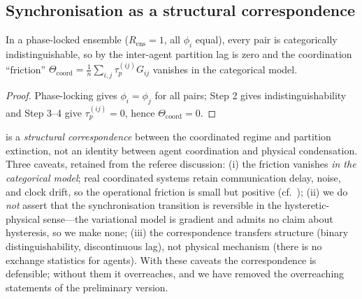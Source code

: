 \documentclass[11pt,twocolumn,a4paper]{article}
\newcommand{\tauP}{\tau_p}
\newcommand{\Ord}{R}
\begin{document}
\subsection{Synchronisation as a structural correspondence}

\begin{proposition}\label{prop:correspondence}
In a phase-locked ensemble ($\Ord_{\mathrm{ens}}=1$, all $\phi_i$ equal), every
pair is categorically indistinguishable, so by  the
inter-agent partition lag is zero and the coordination ``friction''
$\Theta_{\mathrm{coord}}=\frac1n\sum_{i,j}\tauP^{(ij)}G_{ij}$ vanishes in the
categorical model.
\end{proposition}

\begin{proof}
Phase-locking gives $\phi_i=\phi_j$ for all pairs;  Step 2
gives indistinguishability and Step 3--4 give $\tauP^{(ij)}=0$, hence
$\Theta_{\mathrm{coord}}=0$.
\end{proof}

\begin{remark}\label{rem:correspondence-scope}
 is a \emph{structural correspondence} between the
coordinated regime and partition extinction, not an identity between agent
coordination and physical condensation. Three caveats, retained from the
referee discussion: (i) the friction vanishes \emph{in the categorical model};
real coordinated systems retain communication delay, noise, and clock drift,
so the operational friction is small but positive (cf.\
); (ii) we do \emph{not} assert that the
synchronisation transition is reversible in the hysteretic-physical sense---the
variational model is gradient and admits no claim about hysteresis, so we make
none; (iii) the correspondence transfers structure (binary distinguishability,
discontinuous lag), not physical mechanism (there is no exchange statistics for
agents). With these caveats the correspondence is defensible; without them it
overreaches, and we have removed the overreaching statements of the preliminary
version.
\end{remark}
\end{document}
